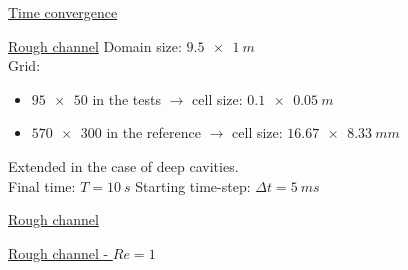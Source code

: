 \documentclass{beamer}
\begin{document}
\begin{frame}{\hyperlink{timeconv}{Time convergence}}
\vspace{-0.8cm}
	\begin{figure}
		\centering
		\subfloat[Pressure]{\hspace{-1cm}}
		\subfloat[Velocity]{}
	\end{figure}
\end{frame}
\begin{frame}[label=roughSupp]{\hyperlink{rough}{Rough channel}}
Domain size: $\SI{9.5x1}{m}$\\[\baselineskip]
Grid:
\begin{itemize}
	\item $\num{95x50}$ in the tests $\rightarrow$ cell size: 
	$\SI{0.1x0.05}{m}$
	\item $\num{570x300}$ in the reference $\rightarrow$ cell size: 
	$\SI{16.67x8.33}{mm}$
\end{itemize}
Extended in the case of deep cavities.\\[\baselineskip]
Final time: $T=\SI{10}{s}$
Starting time-step: $\Delta t=\SI{5}{ms}$
\end{frame}
\begin{frame}{\hyperlink{rough}{Rough channel}}
	\begin{figure}
		\centering
		
	\end{figure}
\end{frame}
\begin{frame}{\hyperlink{rough}{Rough channel - $Re=1$}}
\begin{figure}
	\centering
	
\end{figure}
\end{frame}
\end{document}
